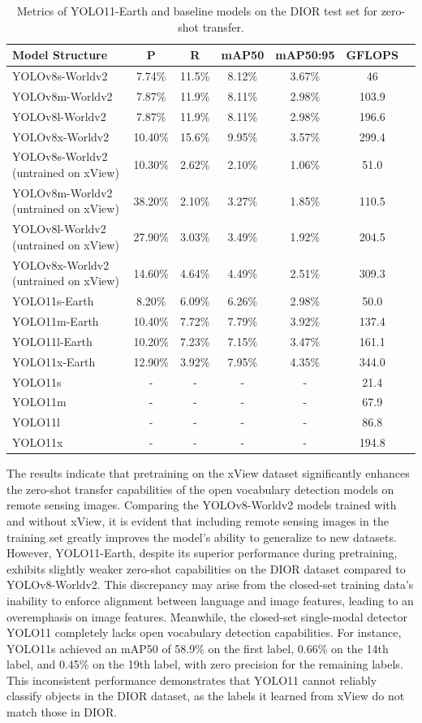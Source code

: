 \documentclass{article}
\begin{document}
\begin{table}[ht]
\centering
\caption{Metrics of YOLO11-Earth and baseline models on the DIOR test set for zero-shot transfer.}
\begin{tabular}{lcccccc}
\toprule
\textbf{Model Structure} & \textbf{P} & \textbf{R} & \textbf{mAP50} & \textbf{mAP50:95} & \textbf{GFLOPS} \\
\midrule
YOLOv8s-Worldv2 & 7.74\% & 11.5\% & 8.12\% & 3.67\% & 46 \\
YOLOv8m-Worldv2 & 7.87\% & 11.9\% & 8.11\% & 2.98\% & 103.9 \\
YOLOv8l-Worldv2 & 7.87\% & 11.9\% & 8.11\% & 2.98\% & 196.6 \\
YOLOv8x-Worldv2 & 10.40\% & 15.6\% & 9.95\% & 3.57\% & 299.4 \\
\midrule
YOLOv8s-Worldv2 (untrained on xView) & 10.30\% & 2.62\% & 2.10\% & 1.06\% & 51.0 \\
YOLOv8m-Worldv2 (untrained on xView) & 38.20\% & 2.10\% & 3.27\% & 1.85\% & 110.5 \\
YOLOv8l-Worldv2 (untrained on xView) & 27.90\% & 3.03\% & 3.49\% & 1.92\% & 204.5 \\
YOLOv8x-Worldv2 (untrained on xView) & 14.60\% & 4.64\% & 4.49\% & 2.51\% & 309.3 \\
\midrule
YOLO11s-Earth & 8.20\% & 6.09\% & 6.26\% & 2.98\% & 50.0 \\
YOLO11m-Earth & 10.40\% & 7.72\% & 7.79\% & 3.92\% & 137.4 \\
YOLO11l-Earth & 10.20\% & 7.23\% & 7.15\% & 3.47\% & 161.1 \\
YOLO11x-Earth & 12.90\% & 3.92\% & 7.95\% & 4.35\% & 344.0 \\
\midrule
YOLO11s & - & - & - & - & 21.4 \\
YOLO11m & - & - & - & - & 67.9 \\
YOLO11l & - & - & - & - & 86.8 \\
YOLO11x & - & - & - & - & 194.8 \\
\bottomrule
\end{tabular}
\end{table}
The results indicate that pretraining on the xView dataset significantly enhances the zero-shot transfer 
capabilities of the open vocabulary detection models on remote sensing images. Comparing the YOLOv8-Worldv2 
models trained with and without xView, it is evident that including remote sensing images in the training set 
greatly improves the model's ability to generalize to new datasets. However, YOLO11-Earth, despite its superior 
performance during pretraining, exhibits slightly weaker zero-shot capabilities on the DIOR dataset compared to 
YOLOv8-Worldv2. This discrepancy may arise from the closed-set training data's inability to enforce alignment 
between language and image features, leading to an overemphasis on image features. Meanwhile, the closed-set 
single-modal detector YOLO11 completely lacks open vocabulary detection capabilities. For instance, YOLO11s 
achieved an mAP50 of 58.9\% on the first label, 0.66\% on the 14th label, and 0.45\% on the 19th label, with 
zero precision for the remaining labels. This inconsistent performance demonstrates that YOLO11 cannot reliably 
classify objects in the DIOR dataset, as the labels it learned from xView do not match those in DIOR.
\end{document}
